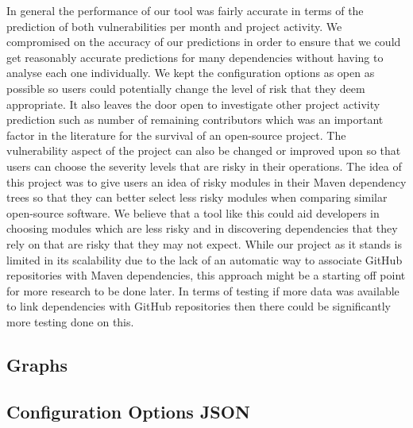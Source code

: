 \documentclass[conference]{IEEEtran}
\begin{document}
In general the performance of our tool was fairly accurate in terms of the prediction of both vulnerabilities per month and project activity. We compromised on the accuracy of our predictions in order to ensure that we could get reasonably accurate predictions for many dependencies without having to analyse each one individually. We kept the configuration options as open as possible so users could potentially change the level of risk that they deem appropriate. It also leaves the door open to investigate other project activity prediction such as number of remaining contributors which was an important factor in the literature for the survival of an open-source project. The vulnerability aspect of the project can also be changed or improved upon so that users can choose the severity levels that are risky in their operations. The idea of this project was to give users an idea of risky modules in their Maven dependency trees so that they can better select less risky modules when comparing similar open-source software. We believe that a tool like this could aid developers in choosing modules which are less risky and in discovering dependencies that they rely on that are risky that they may not expect. While our project as it stands is limited in its scalability due to the lack of an automatic way to associate GitHub repositories with Maven dependencies, this approach might be a starting off point for more research to be done later. In terms of testing if more data was available to link dependencies with GitHub repositories then there could be significantly more testing done on this. 




\appendices

\subsection{Graphs}
\label{Graphs}

\subsection{Configuration Options JSON}
\label{Graphs}

\ifCLASSOPTIONcaptionsoff
  \newpage
\fi
\end{document}

